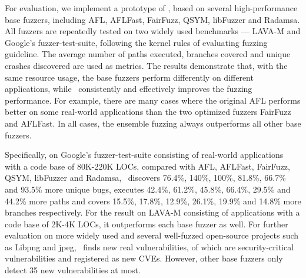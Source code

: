 For evaluation, we implement a prototype of \EnFuzz , based on several high-performance base fuzzers, including AFL, AFLFast, FairFuzz, QSYM, libFuzzer and Radamsa.
All fuzzers are repeatedly tested on two widely used benchmarks --- LAVA-M and Google's fuzzer-test-suite, following the kernel rules of evaluating fuzzing guideline\cite{klees2018evaluating}. %
The average number of paths executed, branches covered and unique crashes discovered are used as metrics. The results demonstrate that, with the same resource usage, the base fuzzers perform differently on different applications, 
while \EnFuzz ~consistently and effectively improves the fuzzing performance. 
For example, there are many cases where the original AFL performs better on some real-world applications than the two optimized fuzzers FairFuzz and AFLFast. 
In all cases, the ensemble fuzzing always outperforms all other base fuzzers. 

Specifically, on Google's fuzzer-test-suite consisting of real-world applications with a code base of 80K-220K LOCs, compared with AFL, AFLFast, FairFuzz, QSYM, libFuzzer and Radamsa, \EnFuzz ~discovers 76.4\%, 140\%, 100\%, 81.8\%, 66.7\% and 93.5\% more unique bugs, executes 42.4\%, 61.2\%, 45.8\%, 66.4\%, 29.5\% and 44.2\% more paths and covers 15.5\%, 17.8\%, 12.9\%, 26.1\%, 19.9\% and 14.8\% more branches respectively.
For the result on LAVA-M consisting of applications with a code base of 2K-4K LOCs, it outperforms each base fuzzer as well. For further evaluation on more widely used and several well-fuzzed open-source projects such as Libpng and jpeg, \EnFuzz ~finds \bugnum new real vulnerabilities, \cvenum of which are security-critical vulnerabilities and registered as new CVEs. However, other base fuzzers only detect 35 new vulnerabilities at most. %


